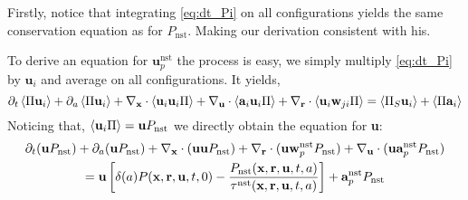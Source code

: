 Firstly, notice that integrating \ref{eq:dt_Pi} on all configurations yields the same conservation equation as \citet{zhang2023evolution} for $P_\text{nst}$. 
Making our derivation consistent with his. 


To derive an equation for $\textbf{u}_p^\text{nst}$ the process is easy, 
we simply multiply \ref{eq:dt_Pi} by $\textbf{u}_i$ and average on all configurations. 
It yields, 
\begin{equation*}
    \partial_t \left<\Pi \textbf{u}_i\right>
    + \partial_a \left<\Pi  \textbf{u}_i\right>
    + {\mathbf{\nabla}_\textbf{x}}\cdot\left<\textbf{u}_i \textbf{u}_i  \Pi\right>
    + {\mathbf{\nabla}_\textbf{u}}\cdot\left<\textbf{a}_i \textbf{u}_i  \Pi\right>
    + {\mathbf{\nabla}_\textbf{r}}\cdot \left< \textbf{u}_i \textbf{w}_{ji} \Pi\right>
    = 
    \left<\Pi_S \textbf{u}_i\right>
    + \left<\Pi \textbf{a}_i \right>
\end{equation*}
Noticing that, $\left<\textbf{u}_i \Pi\right> = \textbf{u}P_\text{nst}$ we directly obtain the equation for \textbf{u}:
\begin{multline*}
    \partial_t (\textbf{u} P_\text{nst})
    + \partial_a (\textbf{u} P_\text{nst})
    + {\mathbf{\nabla}_\textbf{x}} \cdot  (\textbf{u} \textbf{u}  P_\text{nst})
    + {\mathbf{\nabla}_\textbf{r}} \cdot  (\textbf{u}\textbf{w}^\text{nst}_p P_\text{nst})
    + {\mathbf{\nabla}_\textbf{u}} \cdot  (\textbf{u}\textbf{a}^\text{nst}_p P_\text{nst})\\
    = \textbf{u} 
    \left[\delta(a)  P(\textbf{x},\textbf{r}, \textbf{u},t,0)
    - \frac{P_\text{nst}(\textbf{x},\textbf{r},\textbf{u},t,a)}{\tau^\text{nst}(\textbf{x},\textbf{r},\textbf{u},t,a)}
    \right]
    + \textbf{a}_p^\text{nst}
    P_\text{nst} 
\end{multline*}


